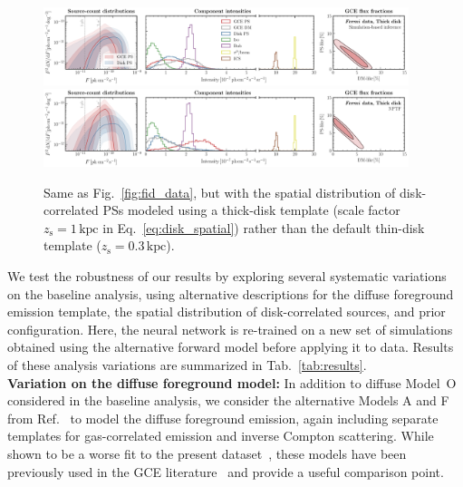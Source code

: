 \documentclass[prd,aps,10pt,nofootinbib,twocolumn,superscriptaddress,preprintnumbers,balancelastpage,longbibliography,floatfix]{revtex4-2}
\begin{document}
%
\begin{figure}[!htbp]
\centering
\includegraphics[width=0.95\textwidth]{plots/data_fid_sbi_thick.pdf}
\includegraphics[width=0.95\textwidth]{plots/data_fid_nptf_thick.pdf}
\caption{Same as Fig.~\ref{fig:fid_data}, but with the spatial distribution of disk-correlated PSs modeled using a thick-disk template (scale factor $z_\mathrm{s}=1\,\mathrm{kpc}$ in Eq.~\eqref{eq:disk_spatial}) rather than the default thin-disk template ($z_\mathrm{s}=0.3\,\mathrm{kpc}$).}
\label{fig:fid_data_thick_disk}
\end{figure}
%

We test the robustness of our results by exploring several systematic variations on the baseline analysis, using alternative descriptions for the diffuse foreground emission template, the spatial distribution of disk-correlated sources, and prior configuration. Here, the neural network is re-trained on a new set of simulations obtained using the alternative forward model before applying it to \Fermi data. Results of these analysis variations are summarized in Tab.~\ref{tab:results}. \\

\noindent
\textbf{Variation on the diffuse foreground model:}
In addition to diffuse {Model~O} considered in the baseline analysis, we consider the alternative Models A and F from Ref.~\cite{Calore:2014xka} to model the diffuse foreground emission, again including separate templates for gas-correlated emission and inverse Compton scattering. While shown to be a worse fit to the present dataset~\cite{Buschmann:2020adf}, these models have been previously used in the GCE literature~\cite{Buschmann:2020adf,Leane:2020pfc,Leane:2020nmi} and provide a useful comparison point.
\end{document}
